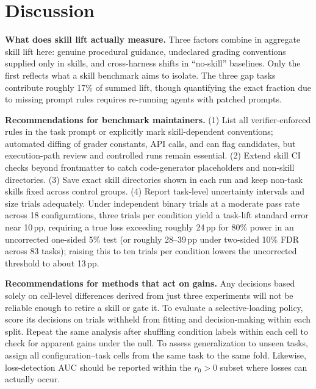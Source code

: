 \documentclass[10pt,conference]{IEEEtran}
\newif\ifkeepcuts \keepcutsfalse
\newcommand{\cut}[1]{\ifkeepcuts #1\fi}
\begin{document}
\section{Discussion}
\label{sec:discussion}
\textbf{What does skill lift actually measure.} Three factors combine in aggregate skill lift here: genuine procedural guidance, undeclared grading conventions supplied only in skills, and cross-harness shifts in ``no-skill'' baselines. Only the first reflects what a skill benchmark aims to isolate. The three gap tasks contribute roughly 17\% of summed lift, though quantifying the exact fraction due to missing prompt rules requires re-running agents with patched prompts.

\textbf{Recommendations for benchmark maintainers.} (1) List all verifier-enforced rules in the task prompt or explicitly mark skill-dependent conventions; automated diffing of grader constants, API calls, and  can flag candidates, but execution-path review and controlled runs remain essential. (2) Extend skill CI checks beyond frontmatter to catch code-generator placeholders and non-skill directories. (3) Save exact skill directories shown in each run and keep non-task skills fixed across control groups. (4) Report task-level uncertainty intervals and size trials adequately. Under independent binary trials at a moderate pass rate across 18 configurations, three trials per condition yield a task-lift standard error near 10\,pp, requiring a true loss exceeding roughly 24\,pp for 80\% power in an uncorrected one-sided 5\% test (or roughly 28--39\,pp under two-sided 10\% FDR across 83 tasks); raising this to ten trials per condition lowers the uncorrected threshold to about 13\,pp.\cut{ These calculations serve only for sample-size planning rather than exact guarantees.}

\textbf{Recommendations for methods that act on gains.} Any decisions based solely on cell-level differences derived from just three experiments will not be reliable enough to retire a skill or gate it. To evaluate a selective-loading policy, score its decisions on trials withheld from fitting and decision-making within each split. Repeat the same analysis after shuffling condition labels within each cell to check for apparent gains under the null. To assess generalization to unseen tasks, assign all configuration--task cells from the same task to the same fold. Likewise, loss-detection AUC should be reported within the $r_{0}>0$ subset where losses can actually occur.
\end{document}
